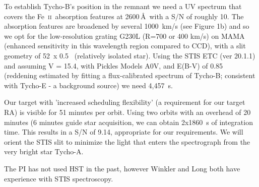 \documentclass[12pt]{article}
\newcommand{\feii}{Fe~\textsc{ii}}
\begin{document}
To establish Tycho-B's position in the remnant we need a UV spectrum that covers the \feii\ absorption features at 2600\,\AA\ with a S/N of roughly 10. The absorption features are broadened by several 1000~km/s (see Figure 1b) and so we opt for the low-resolution grating G230L (R=700 or 400 km/s) on MAMA (enhanced sensitivity in this wavelength region compared to CCD), with a slit geometry of 52\arcsec\ x 0.5 \arcsec\ (relatively isolated star). Using the STIS ETC (ver 20.1.1) and assuming V = 15.4, with Pickles Models A0V, and E(B-V) of 0.85 (reddening estimated by fitting a flux-calibrated spectrum of Tycho-B; consistent with Tycho-E - a background source) we need  4,457~s. 

Our target with 'increased scheduling flexibility' (a requirement for our target RA) is visible for 51 minutes per orbit. Using two orbits with an overhead of 20 minutes (6 minutes guide star acquisition, we can obtain 2x1860~s of integration time. This results in a S/N of  9.14, appropriate for our requirements. We will orient the STIS slit to minimize the light that enters the spectrograph from the very bright star Tycho-A. 



%
%
\specialreq             %


%
%
\coordinatedobs          %


%
%
\duplications           %



%
%
%
\pasthstusage  %
The PI has not used HST in the past, however Winkler and Long both have experience with STIS spectroscopy.

\newpage


\end{document}
